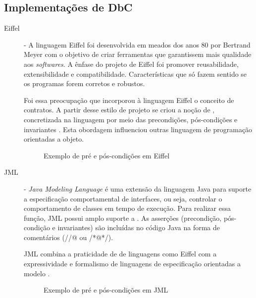 \subsection{Implementações de DbC}

\begin{description}
\item[Eiffel] - A linguagem Eiffel foi desenvolvida em meados dos anos 80 por
Bertrand Meyer \cite{meyer1988eiffel} com o objetivo de criar ferramentas que
garantissem mais qualidade aos \textit{softwares}. A ênfase do projeto de
Eiffel foi promover reusabilidade, extensibilidade e compatibilidade.
Características que só fazem sentido se os programas forem corretos e
robustos.

Foi essa preocupação que incorporou à linguagem Eiffel o conceito de contratos.
A partir desse estilo de projeto se criou a noção de \designbycontract{},
concretizada na linguagem por meio das precondições, pós-condições e invariantes
\cite{meyer1988eiffel}. Esta obordagem influenciou outras linguagem de programação orientadas a objeto.

\vspace{6mm}

\begin{figure}[h]
\begin{small}

\vspace{-.5cm}
\end{small}
\caption{Exemplo de pré e pós-condições em Eiffel}
\label{lst:exemploEiffel}
\end{figure}


\item[JML] - \textit{Java Modeling Language} é uma extensão da linguagem Java
para suporte a especificação comportamental de interfaces, ou seja, controlar o
comportamento de classes em tempo de execução. Para realizar essa função, JML
possui amplo suporte a \designbycontract{}. As asserções (precondição,
pós-condição e invariantes) são incluídas no código Java na forma de comentários
(//@ ou /*@\ldots@*/).

JML combina a praticidade de \designbycontract{} de linguagens como Eiffel com a
expressividade e formalismo de linguagens de especificação orientadas a modelo
\cite{leavens2006design}.

\begin{figure}[h]
\begin{small}

\vspace{-.5cm}
\end{small}
\caption{Exemplo de pré e pós-condições em JML}
\label{lst:exemploJML}
\end{figure}
 

\end{description}
